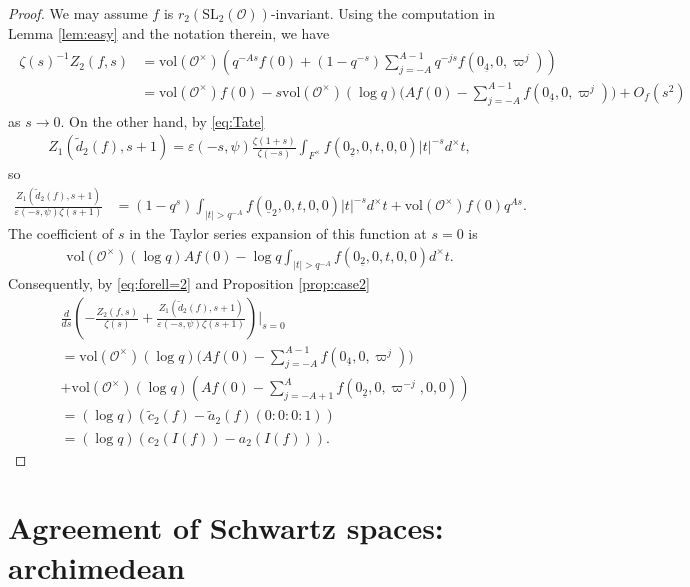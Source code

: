 \documentclass[11pt,a4paper,reqno]{amsart}
\theoremstyle{remark}
\numberwithin{equation}{section}
\newcommand{\SL}{\mathrm{SL}}
\newcommand{\OO}{\mathcal{O}}
\theoremstyle{definition}
\numberwithin{equation}{section}
\begin{document}
\begin{proof}
We may assume $f$ is $r_2(\SL_2(\OO))$-invariant. Using the computation in Lemma \ref{lem:easy} and the notation therein, we have
\begin{align}\label{eq:2asy}
\begin{split}
    \zeta(s)^{-1}Z_{2}(f,s)&=\mathrm{vol}(\mathcal{O}^\times)\left(q^{-As}f(0)+(1-q^{-s})\sum_{j=-A}^{A-1}q^{-js}f(0_{\underline{4}},0,\varpi^j)\right)\\
    &=\mathrm{vol}(\mathcal{O}^\times)f(0)-s\mathrm{vol}(\mathcal{O}^\times)(\log q)\big(Af(0)-\sum_{j=-A}^{A-1}f(0_{\underline{4}},0,\varpi^j)\big)+O_{f}(s^2)
\end{split}
\end{align}
as $s \to 0.$ On the other hand, by \eqref{eq:Tate}
\begin{align*}
    Z_1(\tilde{d}_2(f),s+1)=\varepsilon(-s,\psi)\frac{\zeta(1+s)}{\zeta(-s)}\int_{F^\times} f(0_{\underline{2}},0,t,0,0)|t|^{-s}d^\times t,
\end{align*}
so
\begin{align*}
    \frac{Z_{1}(\tilde{d}_2(f), s+1)}{\varepsilon(-s,\psi)\zeta(s+1)}&=(1-q^s)\int_{|t|> q^{-A}} f(\underline{0}_2,0,t,0,0)|t|^{-s} d^\times  t+\mathrm{vol}(\mathcal{O}^\times)f(0)q^{As}.
\end{align*}
The coefficient of $s$ in the Taylor series expansion of this function at $s=0$ is
\begin{align*}
     \mathrm{vol}(\mathcal{O}^\times)(\log q)Af(0)-\log q \int_{|t|>q^{-A}} f(0_{\underline{2}},0,t,0,0)d^\times t.
\end{align*}
Consequently,  by \eqref{eq:forell=2} and Proposition \ref{prop:case2}
\begin{align*}
    &\frac{d}{ds} \left(-\frac{Z_{2}(f,s)}{\zeta(s)}+\frac{Z_{1}(\tilde{d}_2(f), s+1)}{\varepsilon(-s,\psi)\zeta(s+1)}\right)\Bigg|_{s=0}\\
    &=\mathrm{vol}(\mathcal{O}^\times)(\log q)\big(Af(0)-\sum_{j=-A}^{A-1}f(0_{\underline{4}},0,\varpi^j)\big)\\
    &+\mathrm{vol}(\mathcal{O}^\times)(\log q)(Af(0)-\sum_{j=-A+1}^{A} f(0_{\underline{2}},0,\varpi^{-j},0,0))\\
    &=(\log q)(\tilde{c}_2(f)-\tilde{a}_2(f)(0:0:0:1))\\
    &=(\log q)(c_2(I(f))-a_2(I(f))).
\end{align*}
\end{proof}

\section{Agreement of Schwartz spaces: archimedean}\label{sec:agree:arch}
\end{document}
